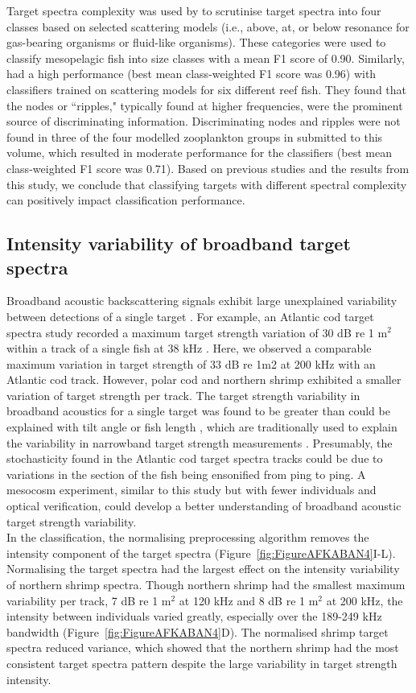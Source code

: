 {Target spectra complexity was used by \citet{Cotter2021} to scrutinise target spectra into four classes based on selected scattering models (i.e., above, at, or below resonance for gas-bearing organisms or fluid-like organisms). These categories were used to classify mesopelagic fish into size classes with a mean F1 score of 0.90. Similarly, \citet{Roa2022} had a high performance (best mean class-weighted F1 score was 0.96) with classifiers trained on scattering models for six different reef fish. They found that the nodes or ``ripples," typically found at higher frequencies, were the prominent source of discriminating information. Discriminating nodes and ripples were not found in three of the four modelled zooplankton groups in \citealt{DunnInPrep} submitted to this volume, which resulted in moderate performance for the classifiers (best mean class-weighted F1 score was 0.71). Based on previous studies and the results from this study, we conclude that classifying targets with different spectral complexity can positively impact classification performance. 


\subsection{Intensity variability of broadband target spectra}
Broadband acoustic backscattering signals exhibit large unexplained variability between detections of a single target \citep{Reeder2004, Gugele2021, Dunning2023}. For example, an Atlantic cod target spectra study recorded a maximum target strength variation of 30 dB re 1 m$^2$ within a track of a single fish at 38 kHz \citep{Dunning2023}. Here, we observed a comparable maximum variation in target strength of 33 dB re 1m2 at 200 kHz with an Atlantic cod track. However, polar cod and northern shrimp exhibited a smaller variation of target strength per track. The target strength variability in broadband acoustics for a single target was found to be greater than could be explained with tilt angle or fish length \citep{Dunning2023}, which are traditionally used to explain the variability in narrowband target strength measurements \citep{Khodabandeloo2021, Zhang2021}. Presumably, the stochasticity found in the Atlantic cod target spectra tracks could be due to variations in the section of the fish being ensonified from ping to ping. A mesocosm experiment, similar to this study but with fewer individuals and optical verification, could develop a better understanding of broadband acoustic target strength variability. \\
In the classification, the normalising preprocessing algorithm removes the intensity component of the target spectra (Figure~\ref{fig:FigureAFKABAN4}I-L). Normalising the target spectra had the largest effect on the intensity variability of northern shrimp spectra. Though northern shrimp had the smallest maximum variability per track, 7 dB re 1 m$^2$ at 120 kHz and 8 dB re 1 m$^2$ at 200 kHz, the intensity between individuals varied greatly, especially over the 189-249 kHz bandwidth (Figure~\ref{fig:FigureAFKABAN4}D). The normalised shrimp target spectra reduced variance, which showed that the northern shrimp had the most consistent target spectra pattern despite the large variability in target strength intensity.


}
